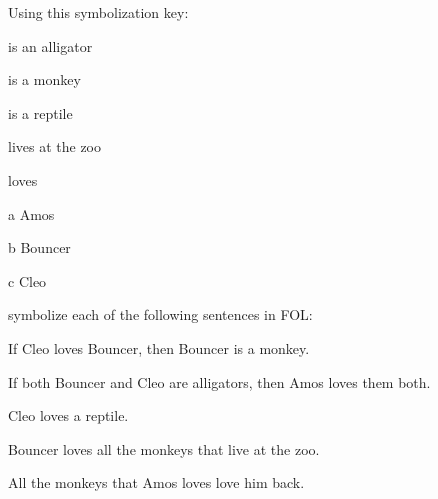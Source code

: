 \begin{practiceproblems}
		\solutions
	\problempart
	Using this symbolization key:
	\begin{ekey}
		\item[\atom{A}{x}]  is an alligator
		\item[\atom{M}{x}]  is a monkey
		\item[\atom{R}{x}]  is a reptile
		\item[\atom{Z}{x}]  lives at the zoo
		\item[\atom{L}{x,y}]  loves 
		\item[a] Amos
		\item[b] Bouncer
		\item[c] Cleo
	\end{ekey}
	symbolize each of the following sentences in FOL:
	\begin{problemslist}
		\item If Cleo loves Bouncer, then Bouncer is a monkey.
		\item[] 
		\item If both Bouncer and Cleo are alligators, then Amos loves them both.
		\item[] 
		\item Cleo loves a reptile.
		\item[] 
		\item Bouncer loves all the monkeys that live at the zoo.
		\item[] \item All the monkeys that Amos loves love him back.
		\item[] 

\end{problemslist}
\end{practiceproblems}
